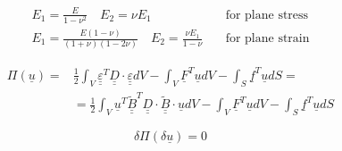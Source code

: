 \documentclass[a4paper]{jpconf}
\begin{document}
\begin{equation}
\begin{split}
E_{1}=\frac{E}{1-\nu^{2}}\quad E_{2}=\nu E_{1}\quad&\text{for plane stress}\\
E_{1}=\frac{E\left(1-\nu\right)}{\left(1+\nu\right)\left(1-2\nu\right)}\quad E_{2}=\frac{\nu E_{1}}{1-\nu}\quad&\text{for plane strain}
\end{split}
\end{equation}

\begin{equation}
\begin{split}
\Pi\left(\underline{u}\right)=&\frac{1}{2}\int_{V}\underline{\underline{\varepsilon}}^{T}\underline{\underline{D}}\cdot\underline{\underline{\varepsilon}}dV-\int_{V}\underline{F}^{T}\underline{u}dV-\int_{S}\underline{f}^{T}\underline{u}dS=\\
&=\frac{1}{2}\int_{V}\underline{u}^{T}\underline{\underline{\widetilde{B}}}^{T}\underline{\underline{D}}\cdot\underline{\underline{\widetilde{B}}}\cdot\underline{u}dV-\int_{V}\underline{F}^{T}\underline{u}dV-\int_{S}\underline{f}^{T}\underline{u}dS
\end{split}
\end{equation}

\begin{equation}
\delta\Pi\left(\delta\underline{u}\right)=0
\end{equation}
\end{document}
